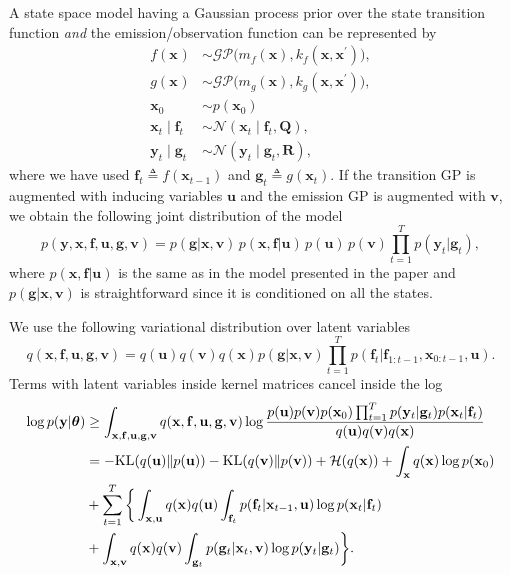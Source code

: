 \documentclass{article} %
\newcommand{\n}[1]{\mathbf{#1}}
\newcommand{\x}{\mathbf{x}}
\newcommand{\y}{\mathbf{y}}
\newcommand{\btheta}{\boldsymbol\theta}
\begin{document}
A state space model having a Gaussian process prior over the state transition function \emph{and} the emission/observation function can be represented by
\begin{subequations}
\begin{align}
f(\x_{}) &\sim \mathcal{GP}\big(m_{f}(\x), k_{f}(\x, \x^\prime)\big),\\ 
g(\x_{}) &\sim \mathcal{GP}\big(m_{g}(\x), k_{g}(\x, \x^\prime)\big),\\ \x_0 &\sim p(\x_0) \\
\x_{t} \mid \n{f}_{t} &\sim \mathcal{N}(\x_{t} \mid \n{f}_{t}, \n{Q}),  \\
\y_{t} \mid \n{g}_{t} &\sim \mathcal{N}(\y_{t} \mid \n{g}_{t}, \n{R}),
\end{align}
\end{subequations}
where we have used $\n{f}_{t} \triangleq f(\x_{t-1})$ and $\n{g}_{t} \triangleq g(\x_{t})$. If the transition GP is augmented with inducing variables $\n{u}$ and the emission GP is augmented with $\n{v}$, we obtain the following joint distribution of the model
\begin{equation}
	p(\y,\x,\n{f},\n{u},\n{g},\n{v}) = p(\n{g} |\x, \n{v}) \, p(\x,\n{f} | \n{u}) \, p(\n{u})\, p(\n{v}) \prod_{t=1}^T p(\y_t | \n{g}_t),
\end{equation}
where $p(\x,\n{f} | \n{u})$ is the same as in the model presented in the paper and $ p(\n{g} |\x, \n{v})$ is straightforward since it is conditioned on all the states.

We use the following variational distribution over latent variables
\begin{equation}
q(\x,\n{f},\n{u},\n{g},\n{v}) = q(\n{u}) q(\n{v}) q(\x) p(\n{g} |\x, \n{v}) \prod_{t=1}^T p(\n{f}_t | \n{f}_{1:t-1},\x_{0:t-1},\n{u}).
\end{equation}
Terms with latent variables inside kernel matrices cancel inside the log
\begin{align}
\log p(\by|\btheta) &\geq \int_{\bx, \bff, \bu,\n{g},\n{v}} q(\bx, \bff, \bu,\n{g},\n{v}) \log \frac{p(\n{u}) p(\n{v}) p(\x_0) \prod_{t=1}^T  p(\y_t | \n{g}_t) p(\x_t | \n{f}_t)}{q(\n{u}) q(\n{v}) q(\x) } \nn\\
&= -\KL(q(\bu) \| p(\bu)) -\KL(q(\n{v}) \| p(\n{v})) + \cH(q(\bx)) + \int_{\bx} q(\bx) \log p(\bx_0) \nn\\
&+ \sum_{t=1}^T \bigg\{ \int_{\bx,\bu} q(\bx) q(\bu) \int_{\bff_t} p(\n{f}_t | \x_{t-1},\n{u}) \log p(\x_t | \n{f}_t)  \nn \\
& + \int_{\bx,\n{v}} q(\bx) q(\n{v}) \int_{\n{g}_t} p(\n{g}_t | \x_{t},\n{v}) \log p(\by_t | \n{g}_t) \bigg\}.  \nn
\end{align}
\end{document}
